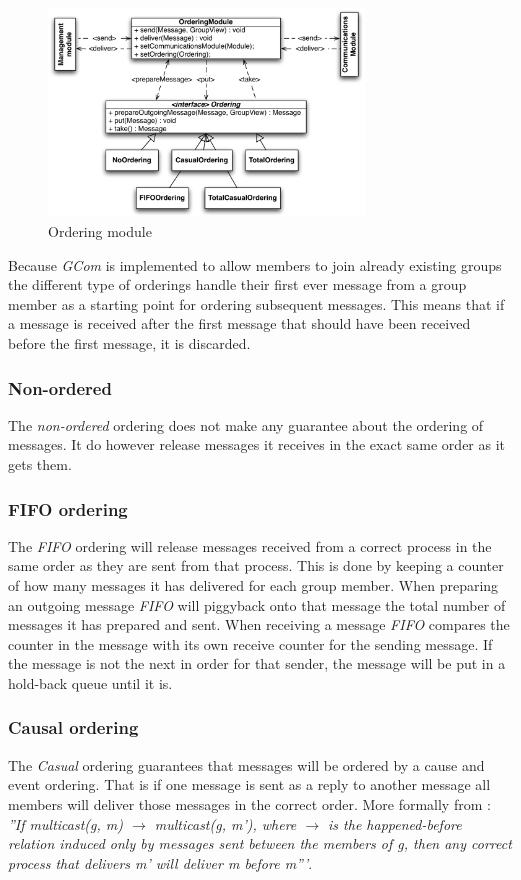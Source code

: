 \documentclass[titlepage, twocolumn, a4paper, 10pt]{article}
\begin{document}
\begin{figure}[!thb]
  \centering
  \includegraphics[width=3.3in]{images/Ordering.pdf}
  \caption{Ordering module}
  \label{fig:images/ordering}
\end{figure}

Because \textit{GCom} is implemented to allow members to join already
existing groups the different type of orderings handle their first
ever message from a group member as a starting point for ordering
subsequent messages. This means that if a message is received after
the first message that should have been received before the first
message, it is discarded.

\subsubsection{Non-ordered}\label{sec:-non-ordered}
The \textit{non-ordered} ordering does not make any guarantee about
the ordering of messages. It do however release messages it receives
in the exact same order as it gets them.

\subsubsection{FIFO ordering}\label{sec:fifo}
The \textit{FIFO} ordering will release messages received from a
correct process in the same order as they are sent from that process.
This is done by keeping a counter of how many messages it has
delivered for each group member. When preparing an outgoing message
\textit{FIFO} will piggyback onto that message the total number of
messages it has prepared and sent. When receiving a message
\textit{FIFO} compares the counter in the message with its own receive
counter for the sending message. If the message is not the next in
order for that sender, the message will be put in a hold-back queue
until it is.

\subsubsection{Causal ordering}\label{sec:causal}
The \textit{Casual} ordering guarantees that messages will be ordered
by a cause and event ordering. That is if one message is sent as a
reply to another message all members will deliver those messages in
the correct order. More formally from \cite{book:dist-syst}:
\textit{''If multicast(g, m) $\rightarrow$ multicast(g, m'), where
  $\rightarrow$ is the happened-before relation induced only by
  messages sent between the members of g, then any correct process
  that delivers m' will deliver m before m'''}.
\end{document}
